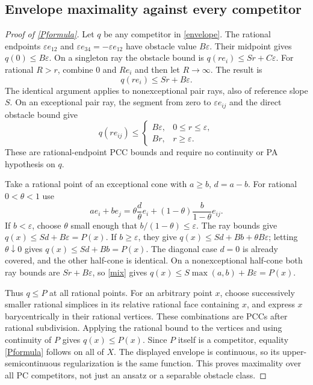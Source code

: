 \documentclass[11pt]{article}
\newcommand{\eps}{\varepsilon}
\begin{document}
\subsection{Envelope maximality against every competitor}
\begin{proof}[Proof of \eqref{Pformula}]
Let $q$ be any competitor in \eqref{envelope}. The rational endpoints $\eps e_{12}$ and $\eps e_{34}=-\eps e_{12}$ have obstacle value $B\eps$. Their midpoint gives $q(0)\leq B\eps$. On a singleton ray the obstacle bound is $q(r e_i)\leq Sr+C\eps$. For rational $R>r$, combine $0$ and $R e_i$ and then let $R\to\infty$. The result is
\begin{equation}\label{raybound}q(r e_i)\leq Sr+B\eps.\end{equation}
The identical argument applies to nonexceptional pair rays, also of reference slope $S$. On an exceptional pair ray, the segment from zero to $\eps e_{ij}$ and the direct obstacle bound give
\[q(r e_{ij})\leq\begin{cases}B\eps,&0\leq r\leq\eps,\\Br,&r\geq\eps.\end{cases}\]
These are rational-endpoint PCC bounds and require no continuity or PA hypothesis on $q$.

Take a rational point of an exceptional cone with $a\geq b$, $d=a-b$. For rational $0<\theta<1$ use
\begin{equation}\label{mix}
 a e_i+b e_j=\theta\frac d\theta e_i+(1-\theta)\frac b{1-\theta}e_{ij}.
\end{equation}
If $b<\eps$, choose $\theta$ small enough that $b/(1-\theta)\leq\eps$. The ray bounds give $q(x)\leq Sd+B\eps=P(x)$. If $b\geq\eps$, they give $q(x)\leq Sd+Bb+\theta B\eps$; letting $\theta\downarrow0$ gives $q(x)\leq Sd+Bb=P(x)$. The diagonal case $d=0$ is already covered, and the other half-cone is identical. On a nonexceptional half-cone both ray bounds are $Sr+B\eps$, so \eqref{mix} gives $q(x)\leq S\max(a,b)+B\eps=P(x)$.

Thus $q\leq P$ at all rational points. For an arbitrary point $x$, choose successively smaller rational simplices in its relative rational face containing $x$, and express $x$ barycentrically in their rational vertices. These combinations are PCCs after rational subdivision. Applying the rational bound to the vertices and using continuity of $P$ gives $q(x)\leq P(x)$. Since $P$ itself is a competitor, equality \eqref{Pformula} follows on all of $X$. The displayed envelope is continuous, so its upper-semicontinuous regularization is the same function. This proves maximality over all PC competitors, not just an ansatz or a separable obstacle class.
\end{proof}
\end{document}
